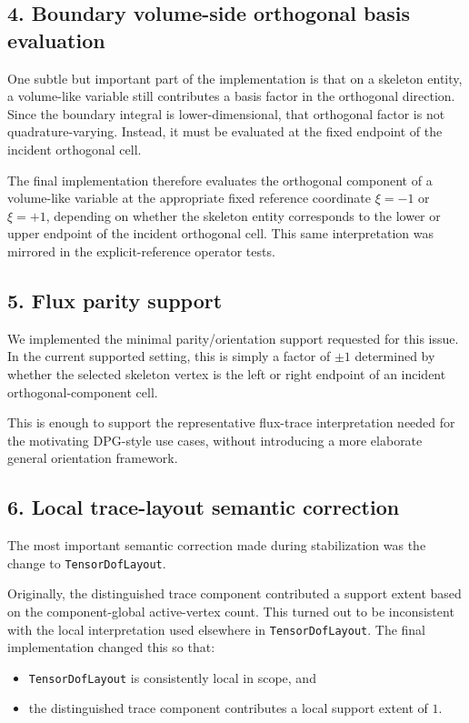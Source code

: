 \documentclass[11pt]{article}
\begin{document}
\subsection{4. Boundary volume-side orthogonal basis evaluation}

One subtle but important part of the implementation is that on a skeleton entity, a volume-like variable still contributes a basis factor in the orthogonal direction. Since the boundary integral is lower-dimensional, that orthogonal factor is not quadrature-varying. Instead, it must be evaluated at the fixed endpoint of the incident orthogonal cell.

The final implementation therefore evaluates the orthogonal component of a volume-like variable at the appropriate fixed reference coordinate \(\xi = -1\) or \(\xi = +1\), depending on whether the skeleton entity corresponds to the lower or upper endpoint of the incident orthogonal cell. This same interpretation was mirrored in the explicit-reference operator tests.

\subsection{5. Flux parity support}

We implemented the minimal parity/orientation support requested for this issue. In the current supported setting, this is simply a factor of \(\pm 1\) determined by whether the selected skeleton vertex is the left or right endpoint of an incident orthogonal-component cell.

This is enough to support the representative flux-trace interpretation needed for the motivating DPG-style use cases, without introducing a more elaborate general orientation framework.

\subsection{6. Local trace-layout semantic correction}

The most important semantic correction made during stabilization was the change to \texttt{TensorDofLayout}.

Originally, the distinguished trace component contributed a support extent based on the component-global active-vertex count. This turned out to be inconsistent with the local interpretation used elsewhere in \texttt{TensorDofLayout}. The final implementation changed this so that:
\begin{itemize}[leftmargin=*]
  \item \texttt{TensorDofLayout} is consistently local in scope, and
  \item the distinguished trace component contributes a local support extent of \(1\).
\end{itemize}
\end{document}
